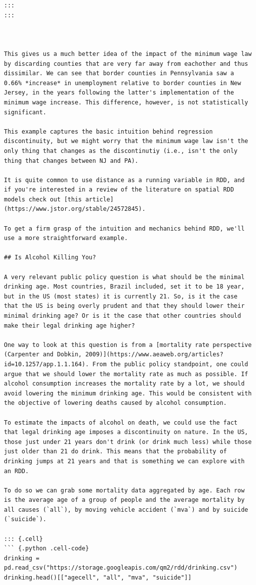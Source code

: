 \documentclass[
  letterpaper,
  DIV=11,
  numbers=noendperiod]{scrreprt}
\begin{document}
\begin{verbatim}
:::
:::



This gives us a much better idea of the impact of the minimum wage law by discarding counties that are very far away from eachother and thus dissimilar. We can see that border counties in Pennsylvania saw a 0.66% *increase* in unemployment relative to border counties in New Jersey, in the years following the latter's implementation of the minimum wage increase. This difference, however, is not statistically significant. 

This example captures the basic intuition behind regression discontinuity, but we might worry that the minimum wage law isn't the only thing that changes as the discontinutiy (i.e., isn't the only thing that changes between NJ and PA). 

It is quite common to use distance as a running variable in RDD, and if you're interested in a review of the literature on spatial RDD models check out [this article](https://www.jstor.org/stable/24572845). 

To get a firm grasp of the intuition and mechanics behind RDD, we'll use a more straightforward example. 

## Is Alcohol Killing You?

A very relevant public policy question is what should be the minimal drinking age. Most countries, Brazil included, set it to be 18 year, but in the US (most states) it is currently 21. So, is it the case that the US is being overly prudent and that they should lower their minimal drinking age? Or is it the case that other countries should make their legal drinking age higher? 

One way to look at this question is from a [mortality rate perspective (Carpenter and Dobkin, 2009)](https://www.aeaweb.org/articles?id=10.1257/app.1.1.164). From the public policy standpoint, one could argue that we should lower the mortality rate as much as possible. If alcohol consumption increases the mortality rate by a lot, we should avoid lowering the minimum drinking age. This would be consistent with the objective of lowering deaths caused by alcohol consumption.

To estimate the impacts of alcohol on death, we could use the fact that legal drinking age imposes a discontinuity on nature. In the US, those just under 21 years don't drink (or drink much less) while those just older than 21 do drink. This means that the probability of drinking jumps at 21 years and that is something we can explore with an RDD.

To do so we can grab some mortality data aggregated by age. Each row is the average age of a group of people and the average mortality by all causes (`all`), by moving vehicle accident (`mva`) and by suicide (`suicide`). 

::: {.cell}
``` {.python .cell-code}
drinking = pd.read_csv("https://storage.googleapis.com/qm2/rdd/drinking.csv")
drinking.head()[["agecell", "all", "mva", "suicide"]]
\end{verbatim}
\end{document}
